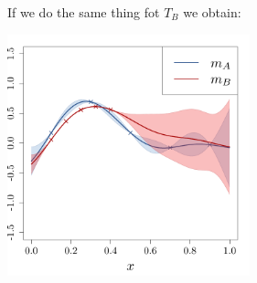 \documentclass{beamer}
\begin{document}
\begin{frame}{}
\begin{example}
	If we do the same thing fot $T_B$ we obtain:
	\begin{center}
	\includegraphics[height=7cm]{figures/R/ch2_multiGPR1}
	\end{center}
\end{example}
\end{frame}
\end{document}
